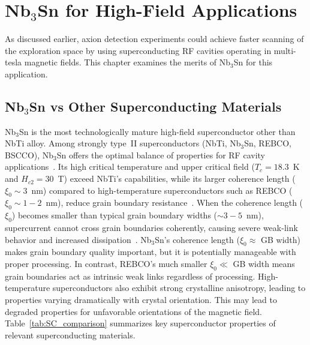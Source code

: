 \chapter{\texorpdfstring{Nb$_3$Sn}{Nb3Sn} for High-Field Applications}\label{sec:whynb3sn}

As discussed earlier, axion detection experiments could achieve faster scanning of the exploration space by using superconducting RF cavities operating in multi-tesla magnetic fields. This chapter examines the merits of  Nb$_3$Sn for this application.

\section{\texorpdfstring{Nb$_3$Sn}{Nb3Sn} vs Other Superconducting Materials}

Nb$_3$Sn is the most technologically mature high-field superconductor other than NbTi alloy. Among strongly type~II superconductors (NbTi, Nb$_3$Sn, REBCO, BSCCO), Nb$_3$Sn offers the optimal balance of properties for RF cavity applications~\cite{gurevichUseNotUse2011}. Its high critical temperature and upper critical field ($T_c = 18.3$~K and $H_{c2} = 30$~T) exceed NbTi's capabilities, while its larger coherence length ($\xi_0 \sim 3$~nm) compared to high-temperature superconductors such as REBCO ($\xi_0\sim 1{-}2$~nm), reduce grain boundary resistance~\cite{gurevichUseNotUse2011}. When the coherence length ($\xi_0$) becomes smaller than typical grain boundary widths ($\sim3{-}5$~nm), supercurrent cannot cross grain boundaries coherently, causing severe weak-link behavior and increased dissipation~\cite{alexgurevich33ThermalRF2006}. Nb$_3$Sn's coherence length ($\xi_0 \approx$ GB width) makes grain boundary quality important, but it is potentially manageable with proper processing. In contrast, REBCO's much smaller $\xi_0 \ll$ GB width means grain boundaries act as intrinsic weak links regardless of processing. High-temperature superconductors also exhibit strong crystalline anisotropy, leading to properties varying dramatically with crystal orientation. This may lead to degraded properties for unfavorable orientations of the magnetic field. Table~\ref{tab:SC_comparison} summarizes key superconductor properties of relevant superconducting materials.



